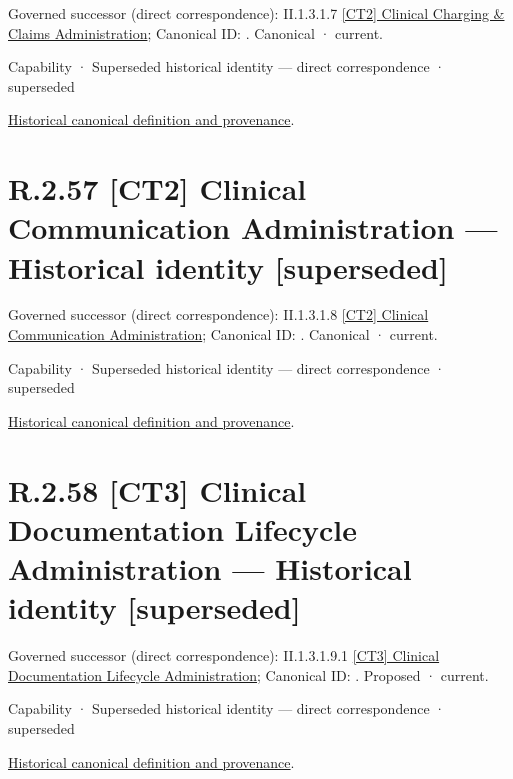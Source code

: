 {\small Governed successor (direct correspondence): II.1.3.1.7 \hyperref[element:af78ab7c89454a608cd4d34ec7703331]{[CT2] Clinical Charging \& Claims Administration}; Canonical ID: \texttt{}. Canonical · current.}\par
\label{element:44433108cc8f4f5f9d7581f9e5b29eb5}
{\small Capability · Superseded historical identity — direct correspondence · superseded}\par
\href{../../../../../../../continuum/strategy/capability/44433108cc8f4f5f9d7581f9e5b29eb5.md}{Historical canonical definition and provenance}.\par
\section*{R.2.57 [CT2] Clinical Communication Administration — Historical identity [superseded]}
\label{navigation:R.2.57}

{\small Governed successor (direct correspondence): II.1.3.1.8 \hyperref[element:b38f2c2811724734b5887b6dbaaabbfc]{[CT2] Clinical Communication Administration}; Canonical ID: \texttt{}. Canonical · current.}\par
\label{element:bd4d6f4a7f03402ba7857383c7be7a4c}
{\small Capability · Superseded historical identity — direct correspondence · superseded}\par
\href{../../../../../../../continuum/strategy/capability/bd4d6f4a7f03402ba7857383c7be7a4c.md}{Historical canonical definition and provenance}.\par
\section*{R.2.58 [CT3] Clinical Documentation Lifecycle Administration — Historical identity [superseded]}
\label{navigation:R.2.58}

{\small Governed successor (direct correspondence): II.1.3.1.9.1 \hyperref[element:df683100067b47e785037c27cfd17a3c]{[CT3] Clinical Documentation Lifecycle Administration}; Canonical ID: \texttt{}. Proposed · current.}\par
\label{element:5b1636373a8d4e788b3ddbc1659a47ef}
{\small Capability · Superseded historical identity — direct correspondence · superseded}\par
\href{../../../../../../../continuum/strategy/capability/5b1636373a8d4e788b3ddbc1659a47ef.md}{Historical canonical definition and provenance}.\par
